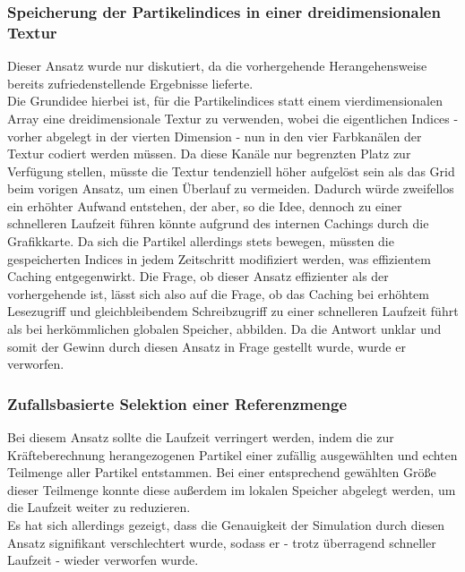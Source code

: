 \subsubsection{Speicherung der Partikelindices in einer dreidimensionalen Textur}
Dieser Ansatz wurde nur diskutiert, da die vorhergehende Herangehensweise bereits zufriedenstellende Ergebnisse lieferte.\\
Die Grundidee hierbei ist, für die Partikelindices statt einem vierdimensionalen Array eine dreidimensionale Textur zu verwenden, wobei die eigentlichen Indices - vorher abgelegt in der vierten Dimension - nun in den vier Farbkanälen der Textur codiert werden müssen. Da diese Kanäle nur begrenzten Platz zur Verfügung stellen, müsste die Textur tendenziell höher aufgelöst sein als das Grid beim vorigen Ansatz, um einen Überlauf zu vermeiden. Dadurch würde zweifellos ein erhöhter Aufwand entstehen, der aber, so die Idee, dennoch zu einer schnelleren Laufzeit führen könnte aufgrund des internen Cachings durch die Grafikkarte. Da sich die Partikel allerdings stets bewegen, müssten die gespeicherten Indices in jedem Zeitschritt modifiziert werden, was effizientem Caching entgegenwirkt. Die Frage, ob dieser Ansatz effizienter als der vorhergehende ist, lässt sich also auf die Frage, ob das Caching bei erhöhtem Lesezugriff und gleichbleibendem Schreibzugriff zu einer schnelleren Laufzeit führt als bei herkömmlichen globalen Speicher, abbilden. Da die Antwort unklar und somit der Gewinn durch diesen Ansatz in Frage gestellt wurde, wurde er verworfen.
\subsubsection{Zufallsbasierte Selektion einer Referenzmenge}
Bei diesem Ansatz sollte die Laufzeit verringert werden, indem die zur Kräfteberechnung herangezogenen Partikel einer zufällig ausgewählten und echten Teilmenge aller Partikel entstammen. Bei einer entsprechend gewählten Größe dieser Teilmenge konnte diese außerdem im lokalen Speicher abgelegt werden, um die Laufzeit weiter zu reduzieren.\\
Es hat sich allerdings gezeigt, dass die Genauigkeit der Simulation durch diesen Ansatz signifikant verschlechtert wurde, sodass er - trotz überragend schneller Laufzeit - wieder verworfen wurde.
